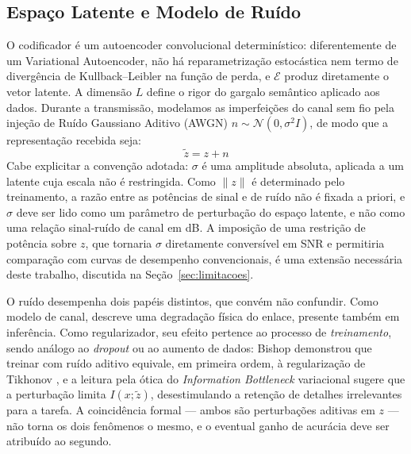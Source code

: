 \documentclass[conference,twocolumn]{IEEEtran}
\begin{document}
\subsection{Espaço Latente e Modelo de Ruído}
O codificador é um autoencoder convolucional determinístico: diferentemente de um Variational Autoencoder, não há reparametrização estocástica nem termo de divergência de Kullback--Leibler na função de perda, e $\mathcal{E}$ produz diretamente o vetor latente. A dimensão $L$ define o rigor do gargalo semântico aplicado aos dados. Durante a transmissão, modelamos as imperfeições do canal sem fio pela injeção de Ruído Gaussiano Aditivo (AWGN) $n \sim \mathcal{N}(0, \sigma^2 I)$, de modo que a representação recebida seja:
\begin{equation}
    \tilde{z} = z + n
\end{equation}
Cabe explicitar a convenção adotada: $\sigma$ é uma amplitude absoluta, aplicada a um latente cuja escala não é restringida. Como $\|z\|$ é determinado pelo treinamento, a razão entre as potências de sinal e de ruído não é fixada a priori, e $\sigma$ deve ser lido como um parâmetro de perturbação do espaço latente, e não como uma relação sinal-ruído de canal em dB. A imposição de uma restrição de potência sobre $z$, que tornaria $\sigma$ diretamente conversível em SNR e permitiria comparação com curvas de desempenho convencionais, é uma extensão necessária deste trabalho, discutida na Seção~\ref{sec:limitacoes}.

O ruído desempenha dois papéis distintos, que convém não confundir. Como modelo de canal, descreve uma degradação física do enlace, presente também em inferência. Como regularizador, seu efeito pertence ao processo de \textit{treinamento}, sendo análogo ao \textit{dropout} ou ao aumento de dados: Bishop demonstrou que treinar com ruído aditivo equivale, em primeira ordem, à regularização de Tikhonov \cite{bishop1995noise}, e a leitura pela ótica do \textit{Information Bottleneck} variacional \cite{alemi2017vib, tishby2015ib} sugere que a perturbação limita $I(x; \tilde{z})$, desestimulando a retenção de detalhes irrelevantes para a tarefa. A coincidência formal --- ambos são perturbações aditivas em $z$ --- não torna os dois fenômenos o mesmo, e o eventual ganho de acurácia deve ser atribuído ao segundo.
\end{document}

